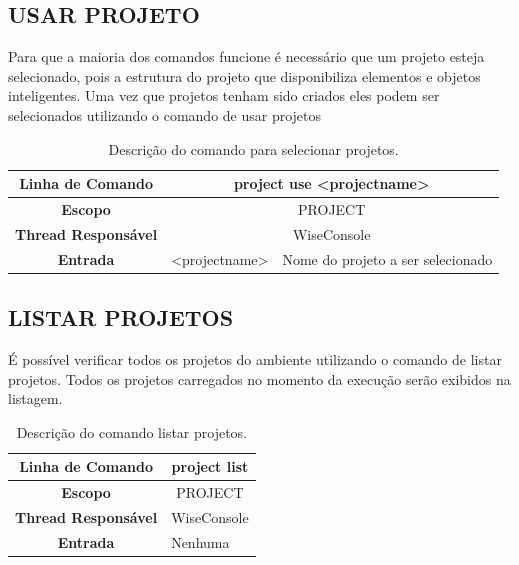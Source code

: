 \documentclass[a4paper,12pt]{monografia}
\theoremstyle{plain}
\theoremstyle{definition}
\theoremstyle{remark}
\begin{document}
\subsection{USAR PROJETO}\label{sec:use_projects}

Para que a maioria dos comandos funcione é necessário que um projeto esteja selecionado, pois a estrutura do projeto que disponibiliza elementos e objetos inteligentes. Uma vez que projetos tenham sido criados eles podem ser selecionados utilizando o comando de usar projetos

\begin{center}
\begin{table}[!htbp]
	\begin{tabular}{|c|c|m{}|}
		\hline
		\textbf{Linha de Comando} & \multicolumn{2}{c|}{project use <project\underline{\space\space}name>} \\
		\hline
		\textbf{Escopo} & \multicolumn{2}{c|}{PROJECT} \\
		\hline
		\textbf{Thread Responsável} & \multicolumn{2}{c|}{WiseConsole} \\
		\hline
		\textbf{Entrada} & <project\underline{\space\space}name> & Nome do projeto a ser selecionado \\
		\hline
	\end{tabular}
	\caption{Descrição do comando para selecionar projetos.}
	\label{tab:use_project}
\end{table}
\end{center}

\subsection{LISTAR PROJETOS}\label{sec:list_projects}

É possível verificar todos os projetos do ambiente utilizando o comando de listar projetos. Todos os projetos carregados no momento da execução serão exibidos na listagem.

\begin{center}
	\begin{table}[!htbp]
		\begin{tabular}{|c|m{}|}
			\hline
			\textbf{Linha de Comando} & \multicolumn{1}{c|}{project list} \\
			\hline
			\textbf{Escopo} & \multicolumn{1}{c|}{PROJECT} \\
			\hline
			\textbf{Thread Responsável} & \multicolumn{1}{c|}{WiseConsole} \\
			\hline
			\textbf{Entrada} & Nenhuma \\
			\hline
		\end{tabular}
		\caption{Descrição do comando listar projetos.}
		\label{tab:list_project}
	\end{table}
\end{center}
\end{document}
